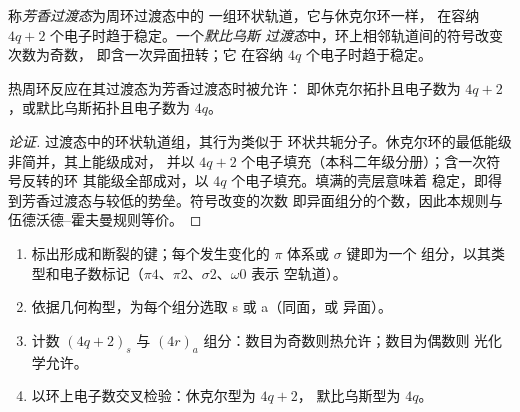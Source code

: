 \begin{definition}[芳香过渡态与默比乌斯过渡态]\label{def:b3:pericyclic:mobius}
称\emph{芳香过渡态}为周环过渡态中的
一组环状轨道，它与休克尔环一样，
在容纳 $4q + 2$ 个电子时趋于稳定。一个\emph{默比乌斯
过渡态}中，环上相邻轨道间的符号改变次数为奇数，
即含一次异面扭转；它
在容纳 $4q$ 个电子时趋于稳定。
\end{definition}

\begin{proposition}[芳香过渡态]\label{prop:b3:pericyclic:aromatic-ts}
热周环反应在其过渡态为芳香过渡态时被允许：
即休克尔拓扑且电子数为 $4q + 2$，或默比乌斯拓扑且电子数为 $4q$。
\end{proposition}

\begin{proof}[论证]
过渡态中的环状轨道组，其行为类似于
环状共轭分子。休克尔环的最低能级非简并，其上能级成对，
并以 $4q + 2$ 个电子填充（本科二年级分册）；含一次符号反转的环
其能级全部成对，以 $4q$ 个电子填充。填满的壳层意味着
稳定，即得到芳香过渡态与较低的势垒。符号改变的次数
即异面组分的个数，因此本规则与
伍德沃德–霍夫曼规则等价。
\end{proof}

\begin{method}[画图与计数组分]\label{met:b3:pericyclic:components}
\begin{enumerate}
  \item 标出形成和断裂的键；每个发生变化的 $\pi$ 体系或 $\sigma$ 键即为一个
        组分，以其类型和电子数标记（$\pi4$、$\pi2$、$\sigma2$、$\omega0$ 表示
        空轨道）。
  \item 依据几何构型，为每个组分选取 s 或 a（同面，或
        异面）。
  \item 计数 $(4q + 2)_s$ 与 $(4r)_a$ 组分：数目为奇数则热允许；数目为偶数则
        光化学允许。
  \item 以环上电子数交叉检验：休克尔型为 $4q + 2$，
        默比乌斯型为 $4q$。
\end{enumerate}
\end{method}

